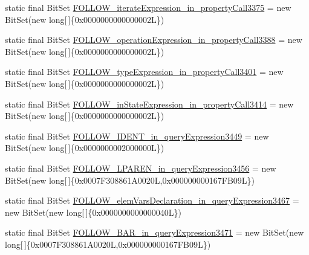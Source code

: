 \begin{DoxyCompactItemize}
\item 
static final Bit\-Set \hyperlink{classorg_1_1tzi_1_1use_1_1parser_1_1soil_1_1_soil_parser_abe81009fdd7ae629856aa20d0e724f05}{F\-O\-L\-L\-O\-W\-\_\-iterate\-Expression\-\_\-in\-\_\-property\-Call3375} = new Bit\-Set(new long\mbox{[}$\,$\mbox{]}\{0x0000000000000002\-L\})
\item 
static final Bit\-Set \hyperlink{classorg_1_1tzi_1_1use_1_1parser_1_1soil_1_1_soil_parser_af67a3d41c29bdd482b52768bd829ea50}{F\-O\-L\-L\-O\-W\-\_\-operation\-Expression\-\_\-in\-\_\-property\-Call3388} = new Bit\-Set(new long\mbox{[}$\,$\mbox{]}\{0x0000000000000002\-L\})
\item 
static final Bit\-Set \hyperlink{classorg_1_1tzi_1_1use_1_1parser_1_1soil_1_1_soil_parser_af4ca541aa3611ed75060e7119851ea26}{F\-O\-L\-L\-O\-W\-\_\-type\-Expression\-\_\-in\-\_\-property\-Call3401} = new Bit\-Set(new long\mbox{[}$\,$\mbox{]}\{0x0000000000000002\-L\})
\item 
static final Bit\-Set \hyperlink{classorg_1_1tzi_1_1use_1_1parser_1_1soil_1_1_soil_parser_a16333d79ff46a36fa174043486216955}{F\-O\-L\-L\-O\-W\-\_\-in\-State\-Expression\-\_\-in\-\_\-property\-Call3414} = new Bit\-Set(new long\mbox{[}$\,$\mbox{]}\{0x0000000000000002\-L\})
\item 
static final Bit\-Set \hyperlink{classorg_1_1tzi_1_1use_1_1parser_1_1soil_1_1_soil_parser_a562eacd50e01bec5bdd14de49bc2dd42}{F\-O\-L\-L\-O\-W\-\_\-\-I\-D\-E\-N\-T\-\_\-in\-\_\-query\-Expression3449} = new Bit\-Set(new long\mbox{[}$\,$\mbox{]}\{0x0000000002000000\-L\})
\item 
static final Bit\-Set \hyperlink{classorg_1_1tzi_1_1use_1_1parser_1_1soil_1_1_soil_parser_af6e0a5544d1bfe73fd5c07031c27fe0f}{F\-O\-L\-L\-O\-W\-\_\-\-L\-P\-A\-R\-E\-N\-\_\-in\-\_\-query\-Expression3456} = new Bit\-Set(new long\mbox{[}$\,$\mbox{]}\{0x0007\-F308861\-A0020\-L,0x000000000167\-F\-B09\-L\})
\item 
static final Bit\-Set \hyperlink{classorg_1_1tzi_1_1use_1_1parser_1_1soil_1_1_soil_parser_a7e0a0b9fa441decd43cdfc1325a71f18}{F\-O\-L\-L\-O\-W\-\_\-elem\-Vars\-Declaration\-\_\-in\-\_\-query\-Expression3467} = new Bit\-Set(new long\mbox{[}$\,$\mbox{]}\{0x0000000000000040\-L\})
\item 
static final Bit\-Set \hyperlink{classorg_1_1tzi_1_1use_1_1parser_1_1soil_1_1_soil_parser_a37e037520d5acf2be7f26e41f10dce96}{F\-O\-L\-L\-O\-W\-\_\-\-B\-A\-R\-\_\-in\-\_\-query\-Expression3471} = new Bit\-Set(new long\mbox{[}$\,$\mbox{]}\{0x0007\-F308861\-A0020\-L,0x000000000167\-F\-B09\-L\})
\item 

\end{DoxyCompactItemize}
